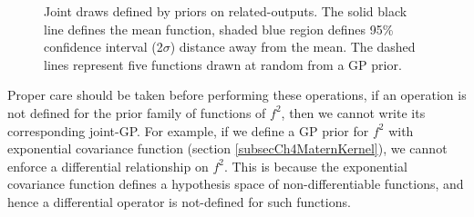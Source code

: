 \begin{figure}[!ht]
  \centering
  \quad
  \caption{Joint draws defined by priors on related-outputs. The solid black line defines the mean function, shaded blue region defines 95\% confidence interval (2$\sigma$) distance away from the mean. The dashed lines represent five functions drawn at random from a GP prior.}
  \label{figJointRelationshipGPPriors}
\end{figure}

Proper care should be taken before performing these operations, if an operation is not defined for the prior family of functions of $f^2$, then we cannot write its corresponding joint-GP. For example, if we define a GP prior for $f^2$ with exponential covariance function (section \ref{subsecCh4MaternKernel}), we cannot enforce a differential relationship on $f^2$. This is because the exponential covariance function defines a hypothesis space of non-differentiable functions, and hence a differential operator is not-defined for such functions.  


